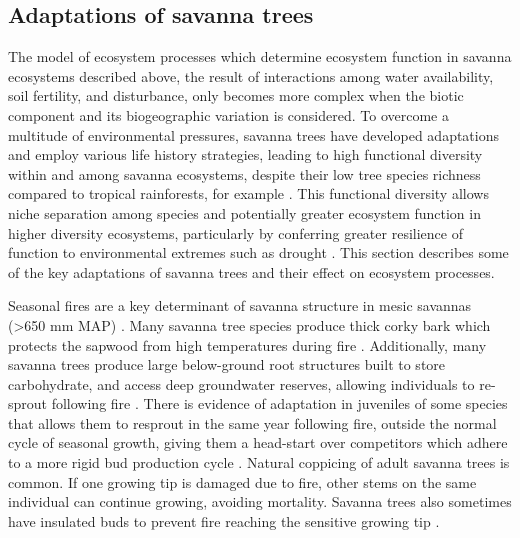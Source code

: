 \begin{refsection}
\subsection{Adaptations of savanna trees}
\label{background:ssec:adapt}

The model of ecosystem processes which determine ecosystem function in savanna ecosystems described above, the result of interactions among water availability, soil fertility, and disturbance, only becomes more complex when the biotic component and its biogeographic variation is considered. To overcome a multitude of environmental pressures, savanna trees have developed adaptations and employ various life history strategies, leading to high functional diversity within and among savanna ecosystems, despite their low tree species richness compared to tropical rainforests, for example \citep{Solbrig1996}. This functional diversity allows niche separation among species and potentially greater ecosystem function in higher diversity ecosystems, particularly by conferring greater resilience of function to environmental extremes such as drought \citep{Diaz2001}. This section describes some of the key adaptations of savanna trees and their effect on ecosystem processes.

Seasonal fires are a key determinant of savanna structure in mesic savannas (>650 mm MAP) \citep{Sankaran2005}. Many savanna tree species produce thick corky bark which protects the sapwood from high temperatures during fire \citep{Hoffmann2012, Lawes2011, Dantas2013}. Additionally, many savanna trees produce large below-ground root structures built to store carbohydrate, and access deep groundwater reserves, allowing individuals to re-sprout following fire \citep{Wigley2019}. There is evidence of adaptation in juveniles of some species that allows them to resprout in the same year following fire, outside the normal cycle of seasonal growth, giving them a head-start over competitors which adhere to a more rigid bud production cycle \citep{Wiegand2006}. Natural coppicing of adult savanna trees is common. If one growing tip is damaged due to fire, other stems on the same individual can continue growing, avoiding mortality. Savanna trees also sometimes have insulated buds to prevent fire reaching the sensitive growing tip \citep{CharlesDominique2015}.


\end{refsection}
